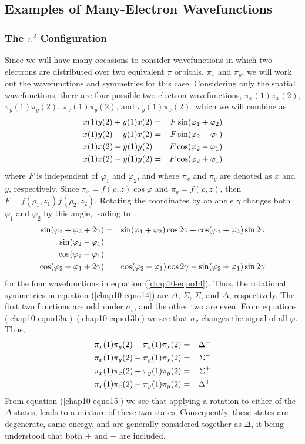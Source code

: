 \subsection{Examples of Many-Electron Wavefunctions}

\subsubsection{The $\pi^2$ Configuration}

Since we will have many occasions to consider wavefunctions in which
two electrons are distributed over two equivalent $\pi$ orbitals, 
$\pi_x$ and $\pi_y$, we will work out the wavefunctions and symmetries 
for this case.  Considering only the spatial wavefunctions, there are 
four possible two-electron wavefunctions, $\pi_x (1) \pi_x (2)$, 
$\pi_y (1) \pi_y (2)$, $\pi_x (1) \pi_y(2)$, and $\pi_y(1) \pi_x(2)$,
which we will combine as
\begin{eqnarray}
x(1) y(2) + y(1) x(2) &=& F \sin ( \varphi_1 + \varphi_2 )\cr
x(1) y(2) - y(1) x(2) &=& F \sin ( \varphi_2 - \varphi_1 )\cr
x(1) x(2) + y(1) y(2) &=& F \cos ( \varphi_2 - \varphi_1 )\cr
x(1) x(2) - y(1) y(2) &=& F \cos ( \varphi_2 + \varphi_1 )
\label{chap10-eqno14}
\end{eqnarray}
where $F$ is independent of $\varphi_1$ and $\varphi_2$, and where 
$\pi_x$ and $\pi_y$ are 
denoted as $x$ and $y$, respectively.  Since $\pi_x = f ( \rho , z ) 
\cos \varphi$ and $\pi_y = f ( \rho , z )$, then $F = f ( \rho_1 , 
z_1 ) f ( \rho_2 , z_2 )$.  Rotating the coordinates by an 
angle $\gamma$ changes both $\varphi_1$ and $\varphi_2$ by this angle, 
leading to
\begin{eqnarray}
\sin ( \varphi_1 + \varphi_2 + 2 \gamma ) &=& \sin ( \varphi_1 + 
\varphi_2 ) \cos 2 \gamma + \cos ( \varphi_1 + \varphi_2 ) \sin 2 
\gamma\cr
\sin ( \varphi_2 - \varphi_1 ) &&\cr
\cos ( \varphi_2 - \varphi_1 ) &&\cr
\cos ( \varphi_2 + \varphi_1 + 2 \gamma ) &=& \cos ( \varphi_2 + 
\varphi_1 ) \cos 2 \gamma - \sin ( \varphi_2 + \varphi_1 ) \sin 2 
\gamma
\label{chap10-eqno15}
\end{eqnarray}
for the four wavefunctions in equation (\ref{chap10-eqno14}).  Thus,
the rotational symmetries in equation (\ref{chap10-eqno14}) are
$\Delta$, $\Sigma$, $\Sigma$, and $\Delta$, respectively.  The first
two functions are odd under $\sigma_v$, and the other two are even.
From equations (\ref{chap10-eqno13a})--(\ref{chap10-eqno13b}) we see
that $\sigma_v$ changes the signal of all $\varphi$.  Thus,
\begin{eqnarray}
\pi_x (1) \pi_y (2) + \pi_y (1) \pi_x (2) &=& \Delta^-\cr
\pi_x (1) \pi_y (2) - \pi_y (1) \pi_x (2) &=& \Sigma^-\cr
\pi_x (1) \pi_x (2) + \pi_y (1) \pi_y (2) &=& \Sigma^+\cr
\pi_x (1) \pi_x (2) - \pi_y (1) \pi_y (2) &=& \Delta^+
\label{chap10-eqno16}
\end{eqnarray}
From equation (\ref{chap10-eqno15}) we see that applying a rotation to
either of the $\Delta$ states, leads to a mixture of these two states.
Consequently, these states are degenerate, same energy, and are
generally considered together as $\Delta$, it being understood that
both $+$ and $-$ are included.

